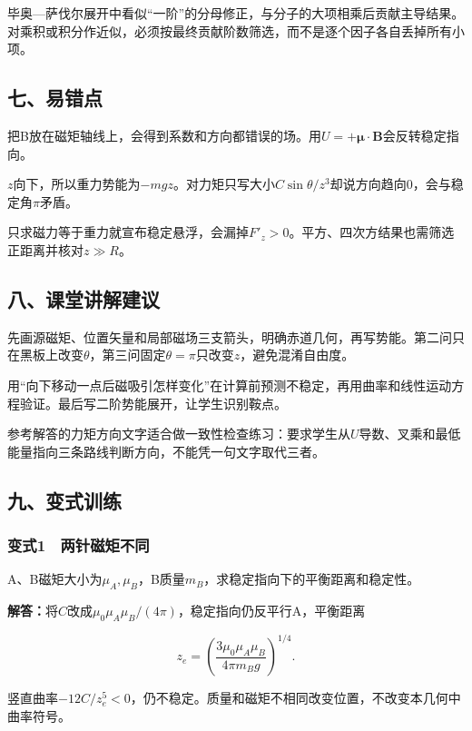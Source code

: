 \documentclass[12pt,a4paper,fontset=fandol]{ctexart}
\begin{document}
毕奥---萨伐尔展开中看似``一阶''的分母修正，与分子的大项相乘后贡献主导结果。对乘积或积分作近似，必须按最终贡献阶数筛选，而不是逐个因子各自丢掉所有小项。

\subsection{七、易错点}\label{ux4e03ux6613ux9519ux70b9-3}

把B放在磁矩轴线上，会得到系数和方向都错误的场。用\(U=+\boldsymbol\mu\cdot\boldsymbol B\)会反转稳定指向。

\(z\)向下，所以重力势能为\(-mgz\)。对力矩只写大小\(C\sin\theta/z^3\)却说方向趋向0，会与稳定角\(\pi\)矛盾。

只求磁力等于重力就宣布稳定悬浮，会漏掉\(F'_z>0\)。平方、四次方结果也需筛选正距离并核对\(z\gg R\)。

\subsection{八、课堂讲解建议}\label{ux516bux8bfeux5802ux8bb2ux89e3ux5efaux8bae-3}

先画源磁矩、位置矢量和局部磁场三支箭头，明确赤道几何，再写势能。第二问只在黑板上改变\(\theta\)，第三问固定\(\theta=\pi\)只改变\(z\)，避免混淆自由度。

用``向下移动一点后磁吸引怎样变化''在计算前预测不稳定，再用曲率和线性运动方程验证。最后写二阶势能展开，让学生识别鞍点。

参考解答的力矩方向文字适合做一致性检查练习：要求学生从\(U\)导数、叉乘和最低能量指向三条路线判断方向，不能凭一句文字取代三者。

\subsection{九、变式训练}\label{ux4e5dux53d8ux5f0fux8badux7ec3-3}

\subsubsection{变式1　两针磁矩不同}\label{ux53d8ux5f0f1-ux4e24ux9488ux78c1ux77e9ux4e0dux540c}

A、B磁矩大小为\(\mu_A,\mu_B\)，B质量\(m_B\)，求稳定指向下的平衡距离和稳定性。

\textbf{解答：}将\(C\)改成\(\mu_0\mu_A\mu_B/(4\pi)\)，稳定指向仍反平行A，平衡距离

\[
z_e=\left(\frac{3\mu_0\mu_A\mu_B}{4\pi m_Bg}\right)^{1/4}.
\]

竖直曲率\(-12C/z_e^5<0\)，仍不稳定。质量和磁矩不相同改变位置，不改变本几何中曲率符号。
\end{document}
